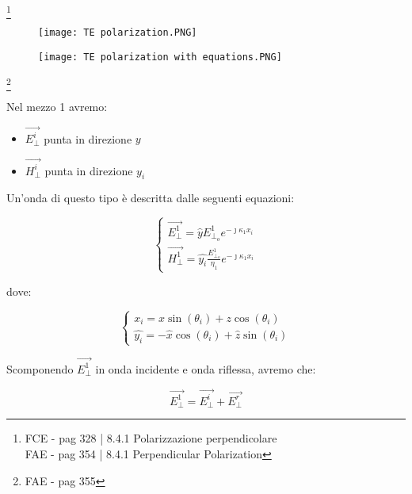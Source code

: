 \footnote{FCE - pag 328 | 8.4.1 Polarizzazione perpendicolare \\ 
FAE - pag 354 | 8.4.1 Perpendicular Polarization} 

\begin{figure}[h]
    \centering
    \texttt{[image: TE polarization.PNG]}
    
\end{figure}    

\begin{figure}[h]
    \centering
    \texttt{[image: TE polarization with equations.PNG]}
    
\end{figure}    

\footnote{FAE - pag 355} 

Nel mezzo 1 avremo: 

\begin{itemize}
    \item $\vec{E_\perp^{i}} $ punta in direzione $y$
    \item $\vec{H_\perp^{i}} $ punta in direzione $y_i$
\end{itemize}

Un'onda di questo tipo è descritta dalle seguenti equazioni: 

{\Large \begin{equation}
    \begin{cases}
        \vec{E_\perp^{1}} = \hat{y} E_{\perp_o}^{1} e^{-\jmath \kappa_1 x_i} \\ 
        \vec{H_\perp^{1}} = \hat{y_i} \frac{E_{\perp_o}^{1}}{\eta_1} e^{-\jmath \kappa_1 x_i}
    \end{cases}
\end{equation}}

dove: 

{\Large \begin{equation}
    \begin{cases}
        x_i = x \sin(\theta_i) + z \cos(\theta_i) \\ 
        \hat{y_i} = -\hat{x} \cos(\theta_i) + \hat{z} \sin(\theta_i)        
    \end{cases}
\end{equation}}

Scomponendo $\vec{E_\perp^{1}}$ in onda incidente e onda riflessa, avremo che: 

{\Large \begin{equation}
    \vec{E_\perp^{1}} = \vec{E_\perp^{i}} + \vec{E_\perp^{r}}
\end{equation}}

